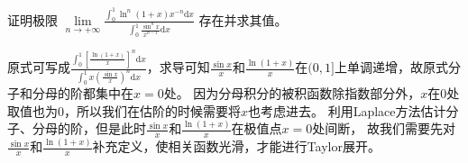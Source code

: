 \documentclass[../../main.tex]{subfiles}%
\begin{document}
\begin{example}
证明极限 $\lim\limits_{n \to +\infty} \frac{\int_{0}^{1} \ln^n(1 + x)x^{-n} \mathrm{d}x}{\int_{0}^{1} \frac{\sin^n x}{x^{n - 1}} \mathrm{d}x}$ 存在并求其值。 
\end{example}
\begin{note}
原式可写成$\frac{\int_0^1{\left[ \frac{\ln \left( 1+x \right)}{x} \right] ^n\mathrm{d}x}}{\int_0^1{x\left( \frac{\sin x}{x} \right) ^n\mathrm{d}x}}$，求导可知$\frac{\sin x}{x}$和$\frac{\ln \left( 1+x \right)}{x}$在$(0,1]$上单调递增，故原式分子和分母的阶都集中在$x = 0$处。
因为分母积分的被积函数除指数部分外，$x$在$0$处取值也为$0$，所以我们在估阶的时候需要将$x$也考虑进去。
利用Laplace方法估计分子、分母的阶，但是此时$\frac{\sin x}{x}$和$\frac{\ln \left( 1+x \right)}{x}$在极值点$x = 0$处间断，
故我们需要先对$\frac{\sin x}{x}$和$\frac{\ln \left( 1+x \right)}{x}$补充定义，使相关函数光滑，才能进行Taylor展开。
\end{note}
\end{document}
